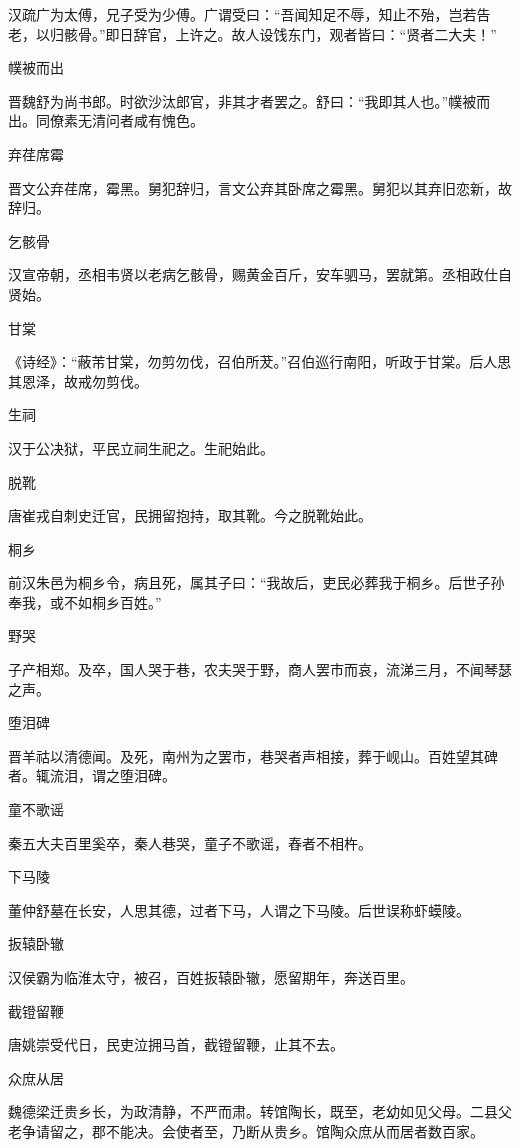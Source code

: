 \documentclass[a4paper,12pt,UTF8,twoside]{ctexbook}
\begin{document}
    汉疏广为太傅，兄子受为少傅。广谓受曰：“吾闻知足不辱，知止不殆，岂若告老，以归骸骨。”即日辞官，上许之。故人设饯东门，观者皆曰：“贤者二大夫！”
    
    幞被而出
    
    晋魏舒为尚书郎。时欲沙汰郎官，非其才者罢之。舒曰：“我即其人也。”幞被而出。同僚素无清问者咸有愧色。
    
    弃荏席霉
    
    晋文公弃荏席，霉黑。舅犯辞归，言文公弃其卧席之霉黑。舅犯以其弃旧恋新，故辞归。
    
    乞骸骨
    
    汉宣帝朝，丞相韦贤以老病乞骸骨，赐黄金百斤，安车驷马，罢就第。丞相政仕自贤始。
    
    甘棠
    
    《诗经》：“蔽芾甘棠，勿剪勿伐，召伯所茇。”召伯巡行南阳，听政于甘棠。后人思其恩泽，故戒勿剪伐。
    
    生祠
    
    汉于公决狱，平民立祠生祀之。生祀始此。
    
    脱靴
    
    唐崔戎自刺史迁官，民拥留抱持，取其靴。今之脱靴始此。
    
    桐乡
    
    前汉朱邑为桐乡令，病且死，属其子曰：“我故后，吏民必葬我于桐乡。后世子孙奉我，或不如桐乡百姓。”
    
    野哭
    
    子产相郑。及卒，国人哭于巷，农夫哭于野，商人罢市而哀，流涕三月，不闻琴瑟之声。
    
    堕泪碑
    
    晋羊祜以清德闻。及死，南州为之罢市，巷哭者声相接，葬于岘山。百姓望其碑者。辄流泪，谓之堕泪碑。
    
    童不歌谣
    
    秦五大夫百里奚卒，秦人巷哭，童子不歌谣，舂者不相杵。
    
    下马陵
    
    董仲舒墓在长安，人思其德，过者下马，人谓之下马陵。后世误称虾蟆陵。
    
    扳辕卧辙
    
    汉侯霸为临淮太守，被召，百姓扳辕卧辙，愿留期年，奔送百里。
    
    截镫留鞭
    
    唐姚崇受代日，民吏泣拥马首，截镫留鞭，止其不去。
    
    众庶从居
    
    魏德梁迁贵乡长，为政清静，不严而肃。转馆陶长，既至，老幼如见父母。二县父老争请留之，郡不能决。会使者至，乃断从贵乡。馆陶众庶从而居者数百家。
    
\end{document}
